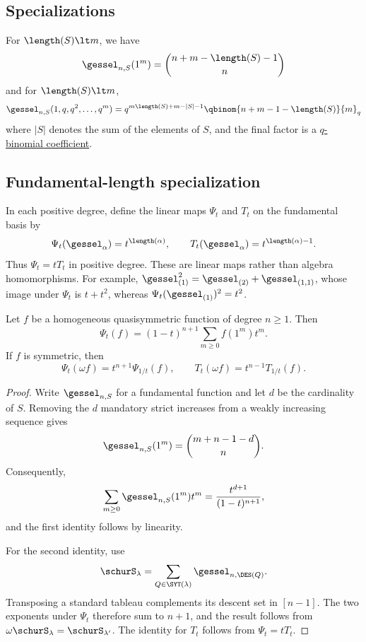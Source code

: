 \subsection[gesselSpecializations]{Specializations}

For $\length(S)\lt m$, we have
\begin{equation*}
 \gessel_{n,S}(1^m) = \binom{n+m-\length(S)-1}{n}
\end{equation*}
and for $\length(S)\lt m$,
\begin{equation*}
 \gessel_{n,S}(1,q,q^2,\dotsc,q^m) =
 q^{m \length(S)+m-|S|-1}\qbinom{n+m-1-\length(S)}{m}_q
\end{equation*}
where $|S|$ denotes the sum of the elements of $S$, and the final factor is a
\hyperref[qBinomialCoefficient]{$q$-binomial coefficient}.


\subsection[gesselLengthSpecialization]{Fundamental-length specialization}

In each positive degree, define the linear maps $\Psi_t$ and $T_t$ on the
fundamental basis by
\[
 \Psi_t(\gessel_\alpha)=t^{\length(\alpha)},
 \qquad
 T_t(\gessel_\alpha)=t^{\length(\alpha)-1}.
\]
Thus $\Psi_t=tT_t$ in positive degree.  These are linear maps rather than
algebra homomorphisms.  For example,
$\gessel_{(1)}^2=\gessel_{(2)}+\gessel_{(1,1)}$, whose image under $\Psi_t$
is $t+t^2$, whereas $\Psi_t(\gessel_{(1)})^2=t^2$.

\begin{proposition}
Let $f$ be a homogeneous quasisymmetric function of degree $n\geq1$.  Then
\[
 \Psi_t(f)=(1-t)^{n+1}\sum_{m\geq0}f(1^m)t^m.
\]
If $f$ is symmetric, then
\[
 \Psi_t(\omega f)=t^{n+1}\Psi_{1/t}(f),
 \qquad
 T_t(\omega f)=t^{n-1}T_{1/t}(f).
\]
\end{proposition}

\begin{proof}
Write $\gessel_{n,S}$ for a fundamental function and let $d$ be the
cardinality of $S$.  Removing the $d$ mandatory strict increases from a
weakly increasing sequence gives
\[
 \gessel_{n,S}(1^m)=\binom{m+n-1-d}{n}.
\]
Consequently,
\[
 \sum_{m\geq0}\gessel_{n,S}(1^m)t^m
 =\frac{t^{d+1}}{(1-t)^{n+1}},
\]
and the first identity follows by linearity.

For the second identity, use
\[
 \schurS_\lambda=\sum_{Q\in\SYT(\lambda)}
 \gessel_{n,\DES(Q)}.
\]
Transposing a standard tableau complements its descent set in $[n-1]$.
The two exponents under $\Psi_t$ therefore sum to $n+1$, and the result
follows from $\omega\schurS_\lambda=\schurS_{\lambda'}$.  The identity for
$T_t$ follows from $\Psi_t=tT_t$.
\end{proof}

